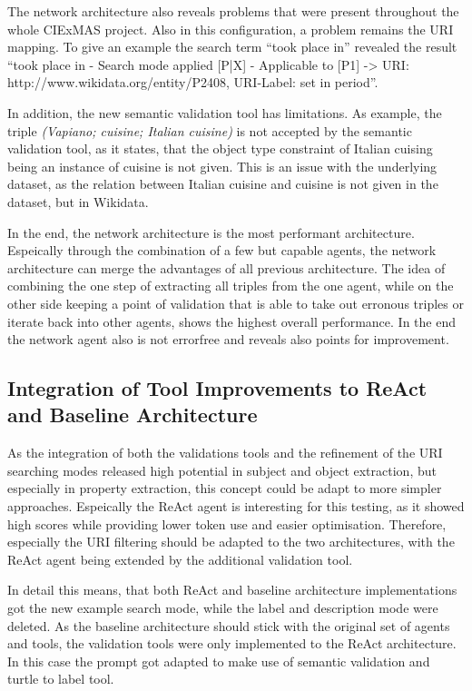 \documentclass[a4paper,oneside,bibliography=totoc]{scrbook}
\begin{document}
The network architecture also reveals problems that were present throughout the whole CIExMAS project. Also in this configuration, a problem remains the URI mapping. To give an example the search term \enquote{took place in} revealed the result \enquote{took place in - Search mode applied [P|X] - Applicable to [P1] -> URI: http://www.wikidata.org/entity/P2408, URI-Label: set in period}.

In addition, the new semantic validation tool has limitations. As example, the triple \textit{(Vapiano; cuisine; Italian cuisine)} is not accepted by the semantic validation tool, as it states, that the object type constraint of Italian cuising being an instance of cuisine is not given. This is an issue with the underlying dataset, as the relation between Italian cuisine and cuisine is not given in the dataset, but in Wikidata.

In the end, the network architecture is the most performant architecture. Espeically through the combination of a few but capable agents, the network architecture can merge the advantages of all previous architecture. The idea of combining the one step of extracting all triples from the one agent, while on the other side keeping a point of validation that is able to take out erronous triples or iterate back into other agents, shows the highest overall performance. In the end the network agent also is not errorfree and reveals also points for improvement.

\subsection{Integration of Tool Improvements to ReAct and Baseline Architecture}
\label{subsec:performance_increases_gen2}

As the integration of both the validations tools and the refinement of the URI searching modes released high potential in subject and object extraction, but especially in property extraction, this concept could be adapt to more simpler approaches. Espeically the ReAct agent is interesting for this testing, as it showed high scores while providing lower token use and easier optimisation. Therefore, especially the URI filtering should be adapted to the two architectures, with the ReAct agent being extended by the additional validation tool.

In detail this means, that both ReAct and baseline architecture implementations got the new example search mode, while the label and description mode were deleted. As the baseline architecture should stick with the original set of agents and tools, the validation tools were only implemented to the ReAct architecture. In this case the prompt got adapted to make use of semantic validation and turtle to label tool.
\end{document}
